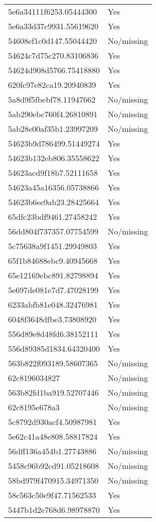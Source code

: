 \begin{tabular}{ll}
5e6a34111f6253.05444300 & Yes \\
5e6a33d37c9931.55619620 & Yes \\
54608ef1c0d147.55044420 & No/missing \\
54624c7d75c270.83106836 & Yes \\
54624d908d5766.75418880 & Yes \\
620fc97e82ca19.20940839 & Yes \\
5a8d9f5fbebf78.11947662 & No/missing \\
5ab290ebc760f4.26810891 & No/missing \\
5ab28e00af35b1.23997209 & No/missing \\
54623b9d786499.51449274 & Yes \\
54623b132eb806.35558622 & Yes \\
54623acd9f18b7.52111658 & Yes \\
54623a45a16356.05738866 & Yes \\
54623b6ee9ab23.28425664 & Yes \\
65dfc23bdf9461.27458242 & Yes \\
56dd804f737357.07754599 & No/missing \\
5c75638a9f1451.29949803 & Yes \\
65f1b84688ebc9.40945668 & Yes \\
65e12169ebc891.82798894 & Yes \\
5e697de081e7d7.47028199 & Yes \\
6233abfb81e048.32476981 & Yes \\
6048f3648dfbe3.73808920 & Yes \\
556d89e8d48fd6.38152111 & Yes \\
556d89385d1834.64320400 & Yes \\
563b822f093189.58607365 & No/missing \\
62c8196034827 & No/missing \\
563b82fd1ba919.52707446 & No/missing \\
62c8195e678a3 & No/missing \\
5c8792d930acf4.50987981 & Yes \\
5e62c41a48e808.58817824 & Yes \\
56dff136a454b1.27743886 & No/missing \\
5458c96b92cd91.05218608 & No/missing \\
58bd979f470915.34971350 & No/missing \\
58c563c50e9f47.71562533 & Yes \\
5447b1d2e768d6.98978870 & Yes \\

\end{tabular}
